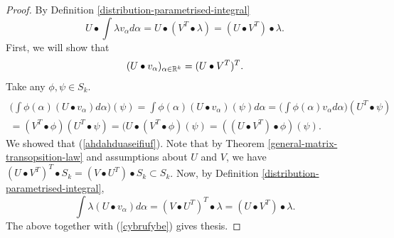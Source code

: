 \documentclass[main.tex]{subfiles}
\begin{document}
\begin{proof}
By Definition \ref{distribution-parametrised-integral}
\begin{equation}
\label{cybrufybe}
U \bullet \int \lambda v_\alpha d\alpha = U \bullet (V^T \bullet \lambda) = (U \bullet V^T) \bullet \lambda.
\end{equation}
First, we will show that 
\begin{equation}
\label{ahdahduaseifiuf}
(U\bullet v_\alpha)_{\alpha\in\mathbb{R}^k} = (U \bullet V^T)^T.
\end{equation}
Take any $\phi, \psi\in S_k$.
\begin{multline}
\\
\bigg(\int \phi(\alpha)(U\bullet v_\alpha)d\alpha \bigg)(\psi) = \int \phi(\alpha)(U\bullet v_\alpha)(\psi)d\alpha = \bigg(\int \phi(\alpha)v_\alpha d\alpha\bigg)(U^T\bullet \psi)\\
= (V^T\bullet \phi)(U^T\bullet \psi) = (U \bullet (V^T\bullet \phi)(\psi) = ((U\bullet V^T)\bullet \phi)(\psi).
\end{multline}
We showed that (\ref{ahdahduaseifiuf}). Note that by Theorem \ref{general-matrix-transopsition-law} and assumptions about $U$ and $V$, we have $(U \bullet V^T)^T \bullet S_k = (V \bullet U^T) \bullet S_k \subset S_k$.
Now, by Definition \ref{distribution-parametrised-integral},
\begin{equation}
\int \lambda (U\bullet v_\alpha) d\alpha = (V \bullet U^T)^T \bullet \lambda = (U\bullet V^T)\bullet \lambda.
\end{equation}
The above together with (\ref{cybrufybe}) gives thesis. 
\end{proof}
\end{document}
